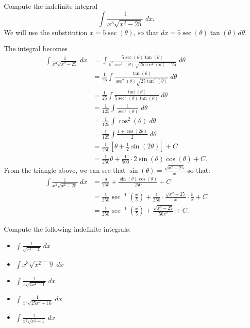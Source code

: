 \documentclass{ximera}
\begin{document}
\begin{example}
Compute the indefinite integral
\[
\int \frac{1}{x^3\sqrt{x^2-25}} \; dx.
\]
We will use the substitution $x = 5\sec(\theta)$,
so that $dx = 5\sec(\theta)\tan(\theta) \, d\theta$.

The integral becomes
\begin{align*}
\int \frac{1}{x^3\sqrt{x^2-25}}\; dx &= \int \frac{5\sec(\theta)\tan(\theta)}{5^3\sec^3(\theta)\sqrt{25\sec^2(\theta)-25}}\; d\theta\\
                                 &=  \frac{1}{25}\int \frac{\tan(\theta)}{\sec^2(\theta)\sqrt{25\tan^2(\theta)}}\; d\theta\\
                                 &=  \frac{1}{25}\int \frac{\tan(\theta)}{5\sec^2(\theta)\tan(\theta)}\; d\theta\\
                                  &=  \frac{1}{125} \int \frac{1}{\sec^2(\theta)} \; d\theta\\
                                  &= \frac{1}{125} \int \cos^2(\theta)  \; d\theta\\
                                  &= \frac{1}{125} \int \frac{1+\cos(2\theta)}{2} \; d\theta\\
                                  &= \frac{1}{250}\left[\theta + \frac12 \sin(2\theta)\right] + C\\
                                  &= \frac{1}{250} \theta + \frac{1}{500} \cdot 2\sin(\theta)\cos(\theta) + C.
\end{align*}
From the triangle above, we can see that $\sin(\theta) = \frac{\sqrt{x^2-25}}{x}$ so that:
\begin{align*}
\int \frac{1}{x^3\sqrt{x^2-25}} \; dx &=  \frac{\theta}{250}  + \frac{\sin(\theta)\cos(\theta)}{250} + C \\
&= \frac{1}{250} \sec^{-1}\left(\frac{x}{5}\right) + \frac{1}{250} \cdot \frac{\sqrt{x^2 - 25}}{x}\cdot \frac{5}{x} + C\\
&= \frac{1}{250} \sec^{-1}\left(\frac{x}{5}\right) + \frac{\sqrt{x^2 - 25}}{50x^2}+ C.
\end{align*}

\end{example}




\begin{problem}
Compute the following indefinite integrals:
\begin{itemize}
\item $\displaystyle{\int   \frac{1}{\sqrt{x^2 - 4}} \; dx}$
\item $\displaystyle{\int   x^3 \sqrt{x^2 - 9} \; dx}$
\item $\displaystyle{\int \frac{1}{x\sqrt{4x^2 - 1}}\; dx}$
\item $\displaystyle{\int \frac{1}{x^2\sqrt{25x^2-16}} \; dx}$
\item $\displaystyle{\int \frac{1}{x^3\sqrt{x^2-1}} \; dx}$
\end{itemize}

\end{problem}
\end{document}
